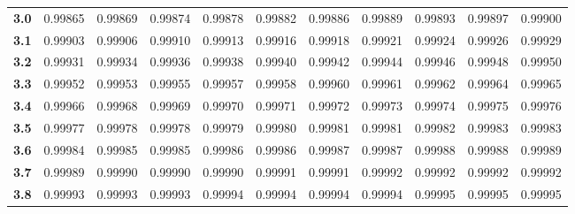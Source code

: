 \begin{center}
\begin{tabular}{c|c|c|c|c|c|c|c|c|c|c}
\textbf{3.0} & 0.99865 & 0.99869 & 0.99874 & 0.99878 & 0.99882 & 0.99886 & 0.99889 & 0.99893 & 0.99897 & 0.99900 \\
\textbf{3.1} & 0.99903 & 0.99906 & 0.99910 & 0.99913 & 0.99916 & 0.99918 & 0.99921 & 0.99924 & 0.99926 & 0.99929 \\
\textbf{3.2} & 0.99931 & 0.99934 & 0.99936 & 0.99938 & 0.99940 & 0.99942 & 0.99944 & 0.99946 & 0.99948 & 0.99950 \\
\textbf{3.3} & 0.99952 & 0.99953 & 0.99955 & 0.99957 & 0.99958 & 0.99960 & 0.99961 & 0.99962 & 0.99964 & 0.99965 \\
\textbf{3.4} & 0.99966 & 0.99968 & 0.99969 & 0.99970 & 0.99971 & 0.99972 & 0.99973 & 0.99974 & 0.99975 & 0.99976 \\
\textbf{3.5} & 0.99977 & 0.99978 & 0.99978 & 0.99979 & 0.99980 & 0.99981 & 0.99981 & 0.99982 & 0.99983 & 0.99983 \\
\textbf{3.6} & 0.99984 & 0.99985 & 0.99985 & 0.99986 & 0.99986 & 0.99987 & 0.99987 & 0.99988 & 0.99988 & 0.99989 \\
\textbf{3.7} & 0.99989 & 0.99990 & 0.99990 & 0.99990 & 0.99991 & 0.99991 & 0.99992 & 0.99992 & 0.99992 & 0.99992 \\
\textbf{3.8} & 0.99993 & 0.99993 & 0.99993 & 0.99994 & 0.99994 & 0.99994 & 0.99994 & 0.99995 & 0.99995 & 0.99995 \bstrut\\
\hline
\end{tabular}
\end{center}